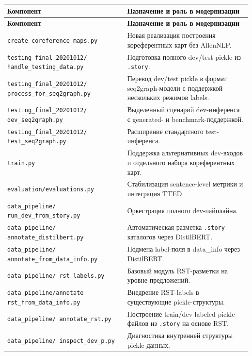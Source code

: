 \documentclass[12pt,a4paper]{article}
\begin{document}
\begin{longtable}{>{\raggedright\arraybackslash}p{} >{\raggedright\arraybackslash}p{}}
\toprule
\textbf{Компонент} & \textbf{Назначение и роль в модернизации} \\
\midrule
\endfirsthead
\toprule
\textbf{Компонент} & \textbf{Назначение и роль в модернизации} \\
\midrule
\endhead
\texttt{create\_coreference\_maps.py} & Новая реализация построения кореферентных карт без AllenNLP. \\
\texttt{testing\_final\_20201012/ handle\_testing\_data.py} & Подготовка полного dev/test pickle из \texttt{.story}. \\
\texttt{testing\_final\_20201012/ process\_for\_seq2graph.py} & Перевод dev/test pickle в формат seq2graph-модели с поддержкой нескольких режимов labels. \\
\texttt{testing\_final\_20201012/ dev\_seq2graph.py} & Выделенный сценарий dev-инференса с generated- и benchmark-поддержкой. \\
\texttt{testing\_final\_20201012/ test\_seq2graph.py} & Расширение стандартного test-инференса. \\
\texttt{train.py} & Поддержка альтернативных dev-входов и отдельного набора кореферентных карт. \\
\texttt{evaluation/evaluations.py} & Стабилизация sentence-level метрики и интеграция TTED. \\
\texttt{data\_pipeline/ run\_dev\_from\_story.py} & Оркестрация полного dev-пайплайна. \\
\texttt{data\_pipeline/ annotate\_distilbert.py} & Автоматическая разметка \texttt{.story} каталогов через DistilBERT. \\
\texttt{data\_pipeline/ annotate\_from\_data\_info.py} & Подмена label-поля в data\_info через DistilBERT. \\
\texttt{data\_pipeline/ rst\_labels.py} & Базовый модуль RST-разметки на уровне предложений. \\
\texttt{data\_pipeline/annotate\_ rst\_from\_data\_info.py} & Внедрение RST-labels в существующие pickle-структуры. \\
\texttt{data\_pipeline/ annotate\_rst.py} & Построение train/dev labeled pickle-файлов из \texttt{.story} на основе RST. \\
\texttt{data\_pipeline/ inspect\_dev\_p.py} & Диагностика внутренней структуры pickle-данных. \\
\bottomrule
\end{longtable}
\end{document}
